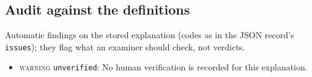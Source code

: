 \begin{drafted}
\subsection{Audit against the definitions}\label{app:churn100-s2-c2:audit}
Automatic findings on the stored explanation (codes as in the JSON record's \texttt{issues}); they flag what an examiner should check, not verdicts.
\begin{itemize}
\item \textsc{warning} \texttt{unverified}: No human verification is recorded for this explanation.
\end{itemize}
\end{drafted}
